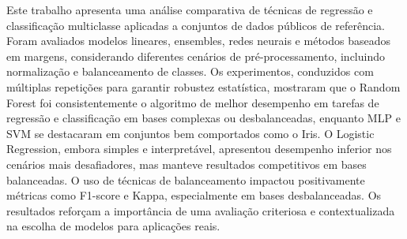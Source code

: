 Este trabalho apresenta uma análise comparativa de técnicas de regressão e classificação multiclasse aplicadas a conjuntos de dados públicos de referência. Foram avaliados modelos lineares, ensembles, redes neurais e métodos baseados em margens, considerando diferentes cenários de pré-processamento, incluindo normalização e balanceamento de classes. Os experimentos, conduzidos com múltiplas repetições para garantir robustez estatística, mostraram que o Random Forest foi consistentemente o algoritmo de melhor desempenho em tarefas de regressão e classificação em bases complexas ou desbalanceadas, enquanto MLP e SVM se destacaram em conjuntos bem comportados como o Iris. O Logistic Regression, embora simples e interpretável, apresentou desempenho inferior nos cenários mais desafiadores, mas manteve resultados competitivos em bases balanceadas. O uso de técnicas de balanceamento impactou positivamente métricas como F1-score e Kappa, especialmente em bases desbalanceadas. Os resultados reforçam a importância de uma avaliação criteriosa e contextualizada na escolha de modelos para aplicações reais.
